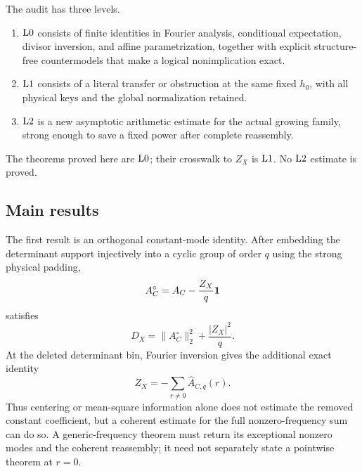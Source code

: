The audit has three levels.
\begin{definition}
\label{def:proof-levels}
\begin{enumerate}[label=\textup{(\roman*)},leftmargin=2.5em]
 \item \(\mathrm{L0}\) consists of finite identities in Fourier analysis,
 conditional expectation, divisor inversion, and affine
 parametrization, together with explicit structure-free
 countermodels that make a logical nonimplication exact.
 \item \(\mathrm{L1}\) consists of a literal transfer or obstruction at the
 same fixed \(h_0\), with all physical keys and the global
 normalization retained.
 \item \(\mathrm{L2}\) is a new asymptotic arithmetic estimate for the
 actual growing family, strong enough to save a fixed power after
 complete reassembly.
\end{enumerate}
\end{definition}
The theorems proved here are \(\mathrm{L0}\); their crosswalk to \(Z_X\) is
\(\mathrm{L1}\).  No \(\mathrm{L2}\) estimate is proved.

\subsection{Main results}

The first result is an orthogonal constant-mode identity.  After
embedding the determinant support injectively into a cyclic group of
order \(q\) using the strong physical padding,
\begin{equation}
 A_C^\circ=A_C-\frac{Z_X}{q}\mathbf 1
 \label{eq:intro-centered-coefficient}
\end{equation}
satisfies
\begin{equation}
 \boxed{
 D_X=\|A_C^\circ\|_2^2+\frac{|Z_X|^2}{q}.}
 \label{eq:intro-constant-mode-energy}
\end{equation}
At the deleted determinant bin, Fourier inversion gives the
additional exact identity
\begin{equation}
 \boxed{
 Z_X=-\sum_{r\ne0}\widehat A_{C,q}(r).}
 \label{eq:intro-coherent-reassembly}
\end{equation}
Thus centering or mean-square information alone does not estimate the
removed constant coefficient, but a coherent estimate for the full
nonzero-frequency sum can do so.  A generic-frequency theorem must
return its exceptional nonzero modes and the coherent reassembly; it
need not separately state a pointwise theorem at \(r=0\).

